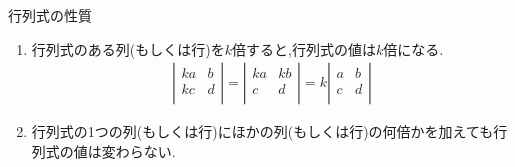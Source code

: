 \documentclass[a4paper]{jsarticle}
\begin{document}
\begin{itembox}[l]{行列式の性質}
\begin{enumerate}[(1)]
\begin{eqnarray*}
\begin{array}{rr}
                      a & b \\
                      a & b \\
                  \end{array} \right|
                  =
                  \left| \begin{array}{rr}
                      a & a \\
                      c & c \\
                  \end{array} \right|
                  =0
              \end{eqnarray*}
        \item 行列式のある列(もしくは行)を$k$倍すると,行列式の値は$k$倍になる.
              \begin{eqnarray*}
                  \left| \begin{array}{rr}
                      ka & b \\
                      kc & d \\
                  \end{array} \right|
                  =
                  \left| \begin{array}{rr}
                      ka & kb \\
                      c  & d  \\
                  \end{array} \right|
                  =
                  k
                  \left| \begin{array}{rr}
                      a & b \\
                      c & d \\
                  \end{array} \right|
              \end{eqnarray*}
        \item 行列式の1つの列(もしくは行)にほかの列(もしくは行)の何倍かを加えても行列式の値は変わらない.
    \end{enumerate}
\end{itembox}
\end{document}
